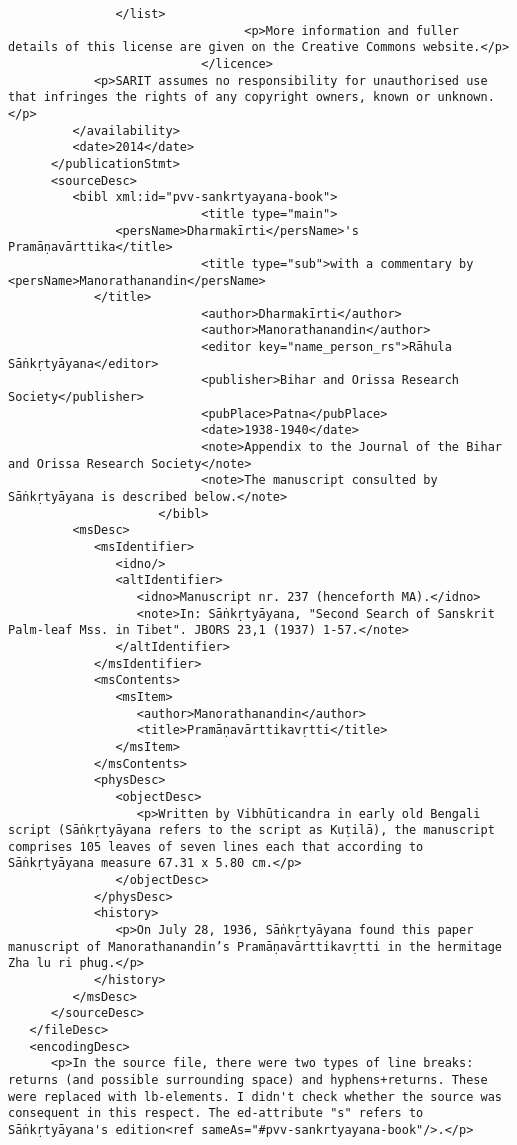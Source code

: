 \documentclass[article,12pt,a4paper]{memoir}
\begin{document}
\begin{verbatim}
               </list>
						         <p>More information and fuller details of this license are given on the Creative Commons website.</p>
					       </licence>
            <p>SARIT assumes no responsibility for unauthorised use that infringes the rights of any copyright owners, known or unknown.</p>
         </availability>
         <date>2014</date>
      </publicationStmt>
      <sourceDesc>
         <bibl xml:id="pvv-sankrtyayana-book">
					       <title type="main">
               <persName>Dharmakīrti</persName>'s Pramāṇavārttika</title>
					       <title type="sub">with a commentary by <persName>Manorathanandin</persName>
            </title>
					       <author>Dharmakīrti</author>
					       <author>Manorathanandin</author>
					       <editor key="name_person_rs">Rāhula Sāṅkṛtyāyana</editor>
					       <publisher>Bihar and Orissa Research Society</publisher>
					       <pubPlace>Patna</pubPlace>
					       <date>1938-1940</date>
					       <note>Appendix to the Journal of the Bihar and Orissa Research Society</note>
					       <note>The manuscript consulted by Sāṅkṛtyāyana is described below.</note>
				     </bibl>
         <msDesc>
            <msIdentifier>
               <idno/>
               <altIdentifier>
                  <idno>Manuscript nr. 237 (henceforth MA).</idno>
                  <note>In: Sāṅkṛtyāyana, "Second Search of Sanskrit Palm-leaf Mss. in Tibet". JBORS 23,1 (1937) 1-57.</note>
               </altIdentifier>
            </msIdentifier>
            <msContents>
               <msItem>
                  <author>Manorathanandin</author>
                  <title>Pramāṇavārttikavṛtti</title>
               </msItem>
            </msContents>
            <physDesc>
               <objectDesc>
                  <p>Written by Vibhūticandra in early old Bengali script (Sāṅkṛtyāyana refers to the script as Kuṭilā), the manuscript comprises 105 leaves of seven lines each that according to Sāṅkṛtyāyana measure 67.31 x 5.80 cm.</p>
               </objectDesc>
            </physDesc>
            <history>
               <p>On July 28, 1936, Sāṅkṛtyāyana found this paper manuscript of Manorathanandin’s Pramāṇavārttikavṛtti in the hermitage Zha lu ri phug.</p>
            </history>
         </msDesc>
      </sourceDesc>
   </fileDesc>
   <encodingDesc>
      <p>In the source file, there were two types of line breaks: returns (and possible surrounding space) and hyphens+returns. These were replaced with lb-elements. I didn't check whether the source was consequent in this respect. The ed-attribute "s" refers to Sāṅkṛtyāyana's edition<ref sameAs="#pvv-sankrtyayana-book"/>.</p>

\end{verbatim}
\end{document}
